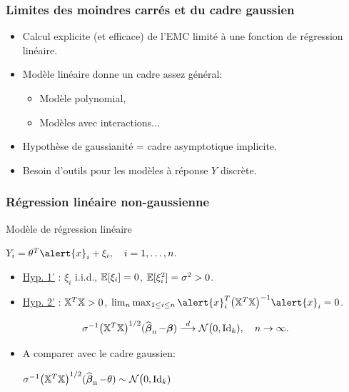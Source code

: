 \begin{frame}
\frametitle{Limites des moindres carrés et du cadre gaussien}
\begin{itemize}
\item Calcul \alert{explicite} (et efficace) de l'EMC  limité à
une fonction de régression \alert{linéaire}.
\item Modèle linéaire donne un cadre assez général:
\begin{itemize}
\item Modèle
polynomial, \item \alert{Modèles avec interactions...}
\end{itemize}
\item \alert{ Hypothèse de gaussianité} = cadre asymptotique implicite.
\item Besoin d'outils pour les modèles  à réponse \alert{$Y$ discrète}.
\end{itemize}
\end{frame}


\begin{frame}
\frametitle{Régression linéaire non-gaussienne} Modèle de
régression linéaire \vspace{3mm} \centerline{$ Y_i= \truetheta^T
\alert{x}_i+\xi_i, \quad i=1,\dots,n.$}

\vspace{-2mm}

\begin{itemize}
\item \underline{Hyp. 1'} : \alert{$\xi_i$ i.i.d., $\operatorname{{\mathbb E}}[\xi_i]
=0$, $\operatorname{{\mathbb E}}[\xi_i^2] = \sigma^2>0$.}
\item \underline{Hyp. 2'} : $\mathbb{X}^T \mathbb{X}>0$, \alert{$\lim_n\max_{1\le i \le n}\alert{x}_i^T
\big(\regressmat^T \regressmat\big)^{-1}\alert{x}_i =0$.}
\end{itemize}
\begin{prop}
$$
\sigma^{-1}\big(\mathbb{X}^T
\mathbb{X}\big)^{1/2}(\operatorname{\widehat{\boldsymbol{\beta}}_n}-\boldsymbol{\beta})\stackrel{d}{\longrightarrow}
{\mathcal N}\big(0, \mathrm{Id}_k), \quad n\to\infty.
$$
\end{prop}
\begin{itemize}
\item A comparer avec le cadre gaussien:\vspace{2mm}
\centerline{$\sigma^{-1}\big(\mathbb{X}^T
\mathbb{X}\big)^{1/2}(\operatorname{\widehat{\boldsymbol{\beta}}_n}-\theta)\sim {\mathcal N}\big(0,
\mathrm{Id}_k)$ }
\end{itemize}
\end{frame}

